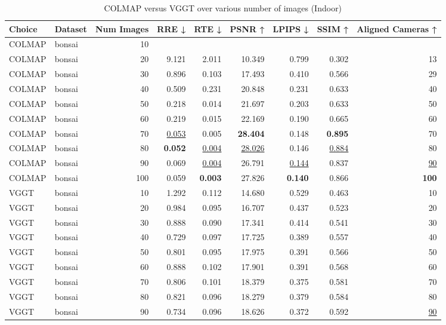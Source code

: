 \begin{table}[H]
\caption{\ifdefined\customcaption \customcaption \else COLMAP versus VGGT over various number of images (Indoor) \fi}
\label{tab:01_num_images_indoor}
\centering
\scriptsize
\begin{tabular}{llrrrrrrr}
\toprule
Choice & Dataset & Num Images & RRE ↓ & RTE ↓ & PSNR ↑ & LPIPS ↓ & SSIM ↑ & Aligned Cameras ↑ \\
\midrule
COLMAP & bonsai & 10 &  &  &  &  &  &  \\
COLMAP & bonsai & 20 & 9.121 & 2.011 & 10.349 & 0.799 & 0.302 & 13 \\
COLMAP & bonsai & 30 & 0.896 & 0.103 & 17.493 & 0.410 & 0.566 & 29 \\
COLMAP & bonsai & 40 & 0.509 & 0.231 & 20.848 & 0.231 & 0.633 & 40 \\
COLMAP & bonsai & 50 & 0.218 & 0.014 & 21.697 & 0.203 & 0.633 & 50 \\
COLMAP & bonsai & 60 & 0.219 & 0.015 & 22.169 & 0.190 & 0.665 & 60 \\
COLMAP & bonsai & 70 & \underline{0.053} & 0.005 & \textbf{28.404} & 0.148 & \textbf{0.895} & 70 \\
COLMAP & bonsai & 80 & \textbf{0.052} & \underline{0.004} & \underline{28.026} & 0.146 & \underline{0.884} & 80 \\
COLMAP & bonsai & 90 & 0.069 & \underline{0.004} & 26.791 & \underline{0.144} & 0.837 & \underline{90} \\
COLMAP & bonsai & 100 & 0.059 & \textbf{0.003} & 27.826 & \textbf{0.140} & 0.866 & \textbf{100} \\
VGGT & bonsai & 10 & 1.292 & 0.112 & 14.680 & 0.529 & 0.463 & 10 \\
VGGT & bonsai & 20 & 0.984 & 0.095 & 16.707 & 0.437 & 0.523 & 20 \\
VGGT & bonsai & 30 & 0.888 & 0.090 & 17.341 & 0.414 & 0.541 & 30 \\
VGGT & bonsai & 40 & 0.729 & 0.097 & 17.725 & 0.389 & 0.557 & 40 \\
VGGT & bonsai & 50 & 0.801 & 0.095 & 17.975 & 0.391 & 0.566 & 50 \\
VGGT & bonsai & 60 & 0.888 & 0.102 & 17.901 & 0.391 & 0.568 & 60 \\
VGGT & bonsai & 70 & 0.806 & 0.101 & 18.379 & 0.375 & 0.581 & 70 \\
VGGT & bonsai & 80 & 0.821 & 0.096 & 18.279 & 0.379 & 0.584 & 80 \\
VGGT & bonsai & 90 & 0.734 & 0.096 & 18.626 & 0.372 & 0.592 & \underline{90} \\

\end{tabular}
\end{table}
